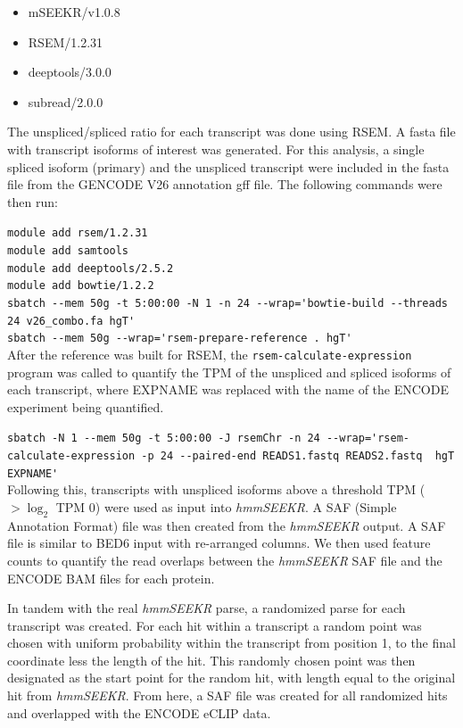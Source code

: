 \begin{itemize}
   \item mSEEKR/v1.0.8
    \item RSEM/1.2.31
    \item deeptools/3.0.0
    \item  subread/2.0.0
\end{itemize}

The unspliced/spliced ratio for each transcript was done using RSEM. A fasta file with transcript isoforms of interest was generated. For this analysis, a single spliced isoform (primary) and the unspliced transcript were included in the fasta file from the GENCODE V26 annotation gff file. The following commands were then run: 

\lstinline{module add rsem/1.2.31}\\
\lstinline{module add samtools}\\
\lstinline{module add deeptools/2.5.2}\\
\lstinline{module add bowtie/1.2.2}\\
\lstinline{sbatch --mem 50g -t 5:00:00 -N 1 -n 24 --wrap='bowtie-build --threads 24 v26_combo.fa hgT'}\\
\lstinline{sbatch --mem 50g --wrap='rsem-prepare-reference . hgT'}\\    


After the reference was built for RSEM, the \texttt{rsem-calculate-expression} program was called to quantify the TPM of the unspliced and spliced isoforms of each transcript, where EXPNAME was replaced with the name of the ENCODE experiment being quantified. 

\lstinline{sbatch -N 1 --mem 50g -t 5:00:00 -J rsemChr -n 24 --wrap='rsem-calculate-expression -p 24 --paired-end READS1.fastq READS2.fastq  hgT EXPNAME'}\\

Following this, transcripts with unspliced isoforms above a threshold TPM ($> \log_2$ TPM 0) were used as input into \emph{hmmSEEKR}. A SAF (Simple Annotation Format) file was then created from the \emph{hmmSEEKR} output. A SAF file is similar to BED6 input with re-arranged columns. We then used feature counts to quantify the read overlaps between the \emph{hmmSEEKR} SAF file and the ENCODE BAM files for each protein. 

In tandem with the real \emph{hmmSEEKR} parse, a randomized parse for each transcript was created. For each hit within a transcript a random point was chosen with uniform probability within the transcript from position 1, to the final coordinate less the length of the hit. This randomly chosen point was then designated as the start point for the random hit, with length equal to the original hit from \emph{hmmSEEKR}. From here, a SAF file was created for all randomized hits and overlapped with the ENCODE eCLIP data. 

